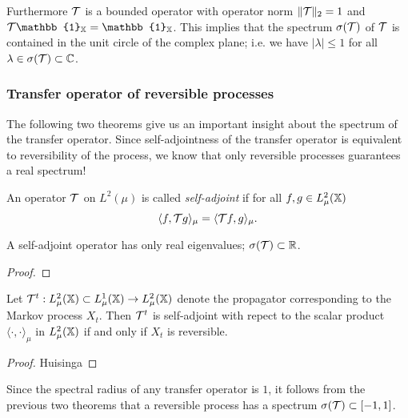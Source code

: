 Furthermore $\mathcal{T}$ is a bounded operator with operator norm $\Vert \mathcal{T} \Vert_2 =1$  and $\Tcal  \mathbb{1}_\X = \mathbb{1}_\X$. This implies that the spectrum $\sigma(\mathcal{T})$ of $\mathcal{T}$ is contained in the unit circle of the complex plane; i.e. we have $| \lambda | \leq 1$ for all $\lambda \in \sigma(\mathcal{T}) \subset \mathbb{C}$. 

\subsubsection*{Transfer operator of reversible processes}

The following two theorems give us an important insight about the spectrum of the transfer operator. Since self-adjointness of the transfer operator is equivalent to reversibility of the process, we know that only reversible processes guarantees a real spectrum!

\begin{defi}
An operator $\mathcal{T}$ on $L^2(\mu)$ is called \textit{self-adjoint} if for all $f,g \in L_\mu^2(\mathbb{X})$
\begin{equation*}
\langle f, \mathcal{T} g \rangle_\mu = \langle \mathcal{T} f, g \rangle_\mu.
\end{equation*}
\end{defi}

\begin{lem}
\label{thm:selfadjoint_real}
A self-adjoint operator has only real eigenvalues; $\sigma(\mathcal{T}) \subset \mathbb{R}$.
\end{lem}
\begin{proof}
\end{proof}

\begin{thm}
\label{thm:selfadjoint_reversible}
Let $\mathcal{T}^t: L_\mu^2(\mathbb{X}) \subset L_\mu^1(\mathbb{X}) \rightarrow L_\mu^2(\mathbb{X})$ denote the propagator corresponding to the Markov process $X_t$. Then $\mathcal{T}^t$ is self-adjoint with repect to the scalar product $\langle \cdot, \cdot \rangle_\mu$ in $L_\mu^2(\mathbb{X})$
if and only if $X_t$ is reversible.
\end{thm}
\begin{proof}
Huisinga\cite{huisinga2001metastability}
\end{proof}
Since the spectral radius of any transfer operator is $1$, it follows from the previous two theorems that a reversible process has a spectrum $\sigma(\mathcal{T}) \subset [-1, 1]$.

